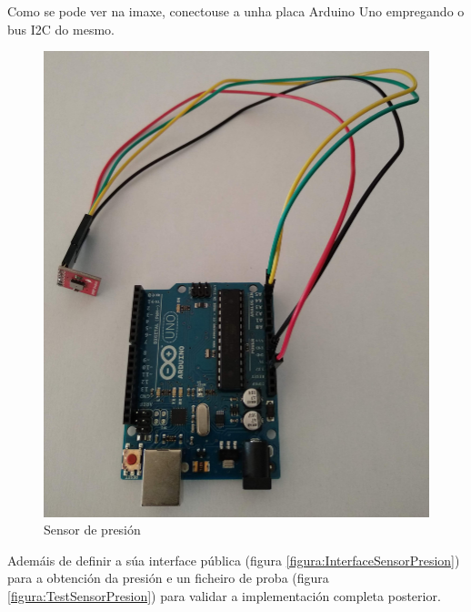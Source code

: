    Como se pode ver na imaxe, conectouse a unha placa Arduino Uno empregando
   o bus I2C do mesmo. \\
  
   \begin{figure}[htbp]
    \centering
    \includegraphics[scale=0.2,keepaspectratio=true]{./imagenes/sensor-presion.jpg}
    \caption{Sensor de presión}
    \label{figura:SensorPresion}
   \end{figure}
   
   Ademáis de definir a súa interface pública (figura 
   \ref{figura:InterfaceSensorPresion}) para a obtención da presión e un
   ficheiro de proba (figura \ref{figura:TestSensorPresion}) para validar a
   implementación completa posterior. \\
   
